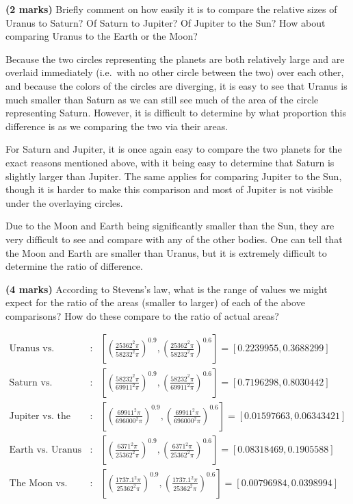 \documentclass[9pt,letter]{article}
\begin{document}
\item 

\textbf{(2 marks)} Briefly comment on how easily it is to compare the
relative sizes of Uranus to Saturn? Of Saturn to Jupiter? Of Jupiter to
the Sun? How about comparing Uranus to the Earth or the Moon?

Because the two circles representing the planets are both relatively
large and are overlaid immediately (i.e.~with no other circle between
the two) over each other, and because the colors of the circles are
diverging, it is easy to see that Uranus is much smaller than Saturn as
we can still see much of the area of the circle representing Saturn.
However, it is difficult to determine by what proportion this difference
is as we comparing the two via their areas.

For Saturn and Jupiter, it is once again easy to compare the two planets
for the exact reasons mentioned above, with it being easy to determine
that Saturn is slightly larger than Jupiter. The same applies for
comparing Jupiter to the Sun, though it is harder to make this
comparison and most of Jupiter is not visible under the overlaying
circles.

Due to the Moon and Earth being significantly smaller than the Sun, they
are very difficult to see and compare with any of the other bodies. One
can tell that the Moon and Earth are smaller than Uranus, but it is
extremely difficult to determine the ratio of difference.

\item 

\textbf{(4 marks)} According to Stevens's law, what is the range of
values we might expect for the ratio of the areas (smaller to larger) of
each of the above comparisons? How do these compare to the ratio of
actual areas?

\[
\begin{array}{rll}
\text{Uranus vs. Saturn} &:& \displaystyle [(\frac{25362^2\pi}{58232^2\pi})^{0.9}, (\frac{25362^2\pi}{58232^2\pi})^{0.6}] = [0.2239955, 0.3688299]\\
\text{Saturn vs. Jupiter} &:& \displaystyle [(\frac{58232^2\pi}{69911^2\pi})^{0.9}, (\frac{58232^2\pi}{69911^2\pi})^{0.6}] = [0.7196298, 0.8030442]\\
\text{Jupiter vs. the Sun} &:& \displaystyle [(\frac{69911^2\pi}{696000^2\pi})^{0.9}, (\frac{69911^2\pi}{696000^2\pi})^{0.6}] = [0.01597663,0.06343421]\\
\text{Earth vs. Uranus} &:& \displaystyle [(\frac{6371^2\pi}{25362^2\pi})^{0.9}, (\frac{6371^2\pi}{25362^2\pi})^{0.6}] = [0.08318469, 0.1905588]\\
\text{The Moon vs. Uranus} &:& \displaystyle [(\frac{1737.1^2\pi}{25362^2\pi})^{0.9}, (\frac{1737.1^2\pi}{25362^2\pi})^{0.6}] = [0.00796984, 0.0398994]\\
\end{array}
\]
\end{document}
